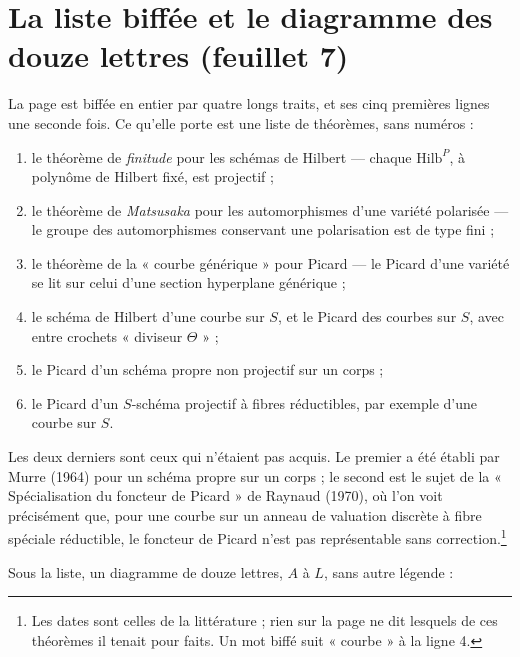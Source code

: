 \documentclass[11pt,a4paper]{article}
\begin{document}
\section*{La liste biffée et le diagramme des douze lettres (feuillet 7)}

La page est biffée en entier par quatre longs traits, et ses cinq premières
lignes une seconde fois. Ce qu'elle porte est une liste de théorèmes, sans
numéros :

\begin{enumerate}
  \item le théorème de \emph{finitude} pour les schémas de Hilbert — chaque
  $\mathrm{Hilb}^{P}$, à polynôme de Hilbert fixé, est projectif ;
  \item le théorème de \emph{Matsusaka} pour les automorphismes d'une variété
  polarisée — le groupe des automorphismes conservant une polarisation est de
  type fini ;
  \item le théorème de la « courbe générique » pour Picard — le Picard d'une
  variété se lit sur celui d'une section hyperplane générique ;
  \item le schéma de Hilbert d'une courbe sur $S$, et le Picard des courbes
  sur $S$, avec entre crochets « diviseur $\Theta$ » ;
  \item le Picard d'un schéma propre non projectif sur un corps ;
  \item le Picard d'un $S$-schéma projectif à fibres réductibles, par exemple
  d'une courbe sur $S$.
\end{enumerate}

Les deux derniers sont ceux qui n'étaient pas acquis. Le premier a été
établi par Murre (1964) pour un schéma propre sur un corps ; le second est le
sujet de la « Spécialisation du foncteur de Picard » de Raynaud (1970), où
l'on voit précisément que, pour une courbe sur un anneau de valuation
discrète à fibre spéciale réductible, le foncteur de Picard n'est pas
représentable sans correction.\footnote{Les dates sont celles de la
littérature ; rien sur la page ne dit lesquels de ces théorèmes il tenait pour
faits. Un mot biffé suit « courbe » à la ligne 4.}

Sous la liste, un diagramme de douze lettres, $A$ à $L$, sans autre légende :

\end{document}
